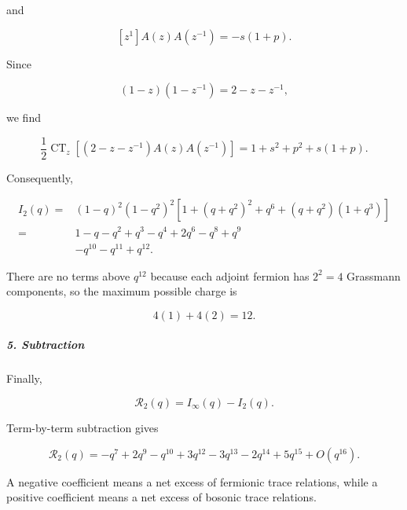 and

\[
[z^1]A(z)A(z^{-1})=-s(1+p).
\]

Since

\[
(1-z)(1-z^{-1})=2-z-z^{-1},
\]

we find

\[
\frac12\operatorname{CT}_{z} \left[(2-z-z^{-1})A(z)A(z^{-1})\right] = 1+s^2+p^2+s(1+p).
\]

Consequently,

\[
\begin{aligned}
I_2(q)
={}&(1-q)^2(1-q^2)^2
\left[1+(q+q^2)^2+q^6+(q+q^2)(1+q^3)\right]\\
={}&1-q-q^2+q^3-q^4+2q^6-q^8+q^9\\
&-q^{10}-q^{11}+q^{12}.
\end{aligned}
\]

There are no terms above $q^{12}$ because each adjoint fermion has $2^2=4$ Grassmann components, so the maximum possible charge is

\[
4(1)+4(2)=12.
\]

\subparagraph*{5. Subtraction}

Finally,

\[
\mathcal R_2(q)=I_\infty(q)-I_2(q).
\]

Term-by-term subtraction gives

\[
\mathcal R_2(q) = -q^7+2q^9-q^{10}+3q^{12} -3q^{13}-2q^{14}+5q^{15} +O(q^{16}).
\]

A negative coefficient means a net excess of fermionic trace relations, while a positive coefficient means a net excess of bosonic trace relations.
